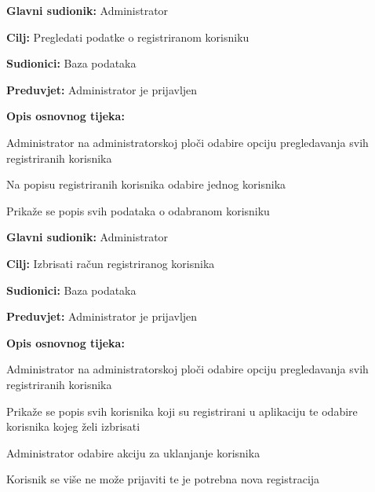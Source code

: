 \noindent {}
\begin{packed_item}
	
	\item \textbf{Glavni sudionik:} Administrator
	\item  \textbf{Cilj:} Pregledati podatke o registriranom korisniku
	\item  \textbf{Sudionici:} Baza podataka
	\item  \textbf{Preduvjet:} Administrator je prijavljen
	\item  \textbf{Opis osnovnog tijeka:}
	
	\item[] \begin{packed_enum}

		\item Administrator na administratorskoj ploči odabire opciju pregledavanja svih registriranih korisnika 
		\item Na popisu registriranih korisnika odabire jednog korisnika
		\item Prikaže se popis svih podataka o odabranom korisniku

	\end{packed_enum}
\end{packed_item}

\noindent {}
\begin{packed_item}
	
	\item \textbf{Glavni sudionik:} Administrator
	\item  \textbf{Cilj:} Izbrisati račun registriranog korisnika
	\item  \textbf{Sudionici:} Baza podataka
	\item  \textbf{Preduvjet:} Administrator je prijavljen
	\item  \textbf{Opis osnovnog tijeka:}
	
	\item[] \begin{packed_enum}
		
		\item Administrator na administratorskoj ploči odabire opciju pregledavanja svih registriranih korisnika 
		\item Prikaže se popis svih korisnika koji su registrirani u aplikaciju te odabire korisnika kojeg želi izbrisati
		\item Administrator odabire akciju za uklanjanje korisnika
		\item Korisnik se više ne može prijaviti te je potrebna nova registracija

	\end{packed_enum}
\end{packed_item}


